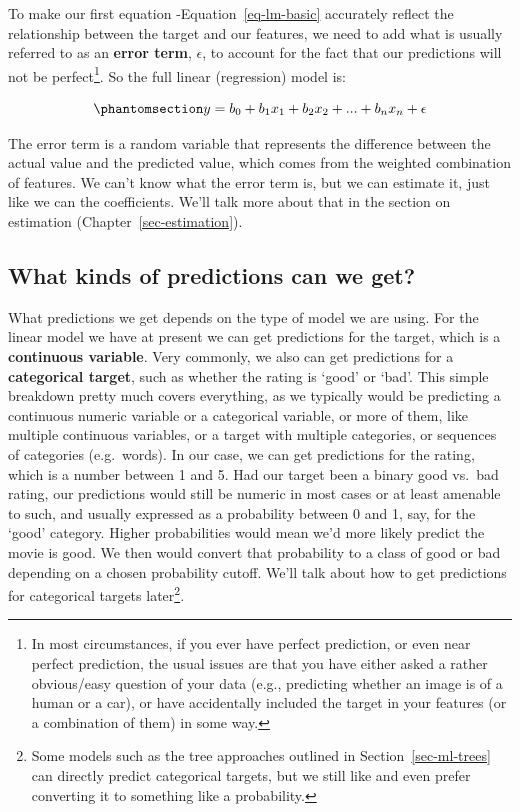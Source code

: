 \documentclass[
  letterpaper,
]{krantz}
\begin{document}
To make our first equation -Equation~\ref{eq-lm-basic} accurately
reflect the relationship between the target and our features, we need to
add what is usually referred to as an \textbf{error term}, \(\epsilon\),
to account for the fact that our predictions will not be
perfect\footnote{In most circumstances, if you ever have perfect
  prediction, or even near perfect prediction, the usual issues are that
  you have either asked a rather obvious/easy question of your data
  (e.g., predicting whether an image is of a human or a car), or have
  accidentally included the target in your features (or a combination of
  them) in some way.}. So the full linear (regression) model is:

\begin{equation}\phantomsection\label{eq-lm-observed}{
y = b_0 + b_1x_1 + b_2x_2 + ... + b_nx_n + \epsilon
}\end{equation}

The error term is a random variable that represents the difference
between the actual value and the predicted value, which comes from the
weighted combination of features. We can't know what the error term is,
but we can estimate it, just like we can the coefficients. We'll talk
more about that in the section on estimation
(Chapter~\ref{sec-estimation}).

\subsection{What kinds of predictions can we
get?}\label{sec-lm-prediction-types}

What predictions we get depends on the type of model we are using. For
the linear model we have at present we can get predictions for the
target, which is a \textbf{continuous variable}. Very commonly, we also
can get predictions for a \textbf{categorical target}, such as whether
the rating is `good' or `bad'. This simple breakdown pretty much covers
everything, as we typically would be predicting a continuous numeric
variable or a categorical variable, or more of them, like multiple
continuous variables, or a target with multiple categories, or sequences
of categories (e.g.~words). In our case, we can get predictions for the
rating, which is a number between 1 and 5. Had our target been a binary
good vs.~bad rating, our predictions would still be numeric in most
cases or at least amenable to such, and usually expressed as a
probability between 0 and 1, say, for the `good' category. Higher
probabilities would mean we'd more likely predict the movie is good. We
then would convert that probability to a class of good or bad depending
on a chosen probability cutoff. We'll talk about how to get predictions
for categorical targets later\footnote{Some models such as the tree
  approaches outlined in Section~\ref{sec-ml-trees} can directly predict
  categorical targets, but we still like and even prefer converting it
  to something like a probability.}.
\end{document}
